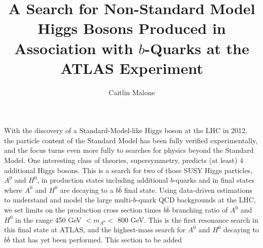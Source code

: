 \documentclass[12pt]{report}
\begin{document}
	\title{A Search for Non-Standard Model Higgs Bosons Produced in Association with $b$-Quarks at the ATLAS Experiment}
	\author{Caitlin Malone}

\beforepreface
{}
With the discovery of a Standard-Model-like Higgs boson at the LHC 
in 2012, the particle content of the Standard Model has been fully verified experimentally,
and the focus turns even more fully to searches for physics beyond the Standard Model.  
One interesting class of theories, supersymmetry, predicts (at least) 4 additional 
Higgs bosons.  This is a search for two of those SUSY Higgs particles, 
$A^0$ and $H^0$, in production states including additional $b$-quarks and in final 
states where $A^0$ and $H^0$ are decaying to a $b\bar{b}$ final state.  
Using data-driven estimations to understand and model the large multi-$b$-quark 
QCD backgrounds at the LHC, we set limits on the production cross section times 
$b\bar{b}$ branching ratio of $A^0$ and $H^0$ in the range 450 GeV $<m_{A^0}<$ 800 GeV.  
This is the first resonance search in this final state at ATLAS, and the 
highest-mass search for $A^0$ and $H^0$ decaying to $b\bar{b}$ that has yet been performed.
This section to be added
\afterpreface


























\end{document}
